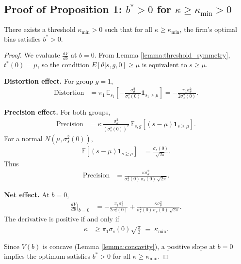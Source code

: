 \subsection{Proof of Proposition 1: $b^* > 0$ for $\kappa \geq \kappa_{\text{min}} > 0$}

\begin{proposition}
There exists a threshold $\kappa_{\min} > 0$ such that for all $\kappa \geq \kappa_{\min}$, the firm's optimal bias satisfies $b^* > 0$.
\end{proposition}

\begin{proof}
We evaluate $\frac{dV}{db}$ at $b=0$. From Lemma \ref{lemma:threshold_symmetry}, $t^*(0)=\mu$, so the condition $E[\theta|s,g,0] \ge \mu$ is equivalent to $s \ge \mu$.

\textbf{Distortion effect.} For group $g=1$,
\begin{align}
\text{Distortion} &= \pi_1 \, \mathbb{E}_{s_1}\left[-\frac{\sigma_\theta^2}{\sigma_s^2(0)} \mathbf{1}_{s_1 \ge \mu}\right] = -\frac{\pi_1 \sigma_\theta^2}{2\sigma_s^2(0)}.
\end{align}

\textbf{Precision effect.} For both groups,
\begin{align}
\text{Precision} &= \kappa \, \frac{\sigma_\theta^2}{(\sigma_s^2(0))^2} \, \mathbb{E}_{s,g}\!\left[(s-\mu)\mathbf{1}_{s \ge \mu}\right].
\end{align}
For a normal $N(\mu,\sigma_s^2(0))$, 
\begin{align}
\mathbb{E}[(s-\mu)\mathbf{1}_{s \ge \mu}] &= \frac{\sigma_s(0)}{\sqrt{2\pi}}.
\end{align}
Thus
\begin{align}
\text{Precision} &= \frac{\kappa \sigma_\theta^2}{\sigma_s^2(0)\,\sigma_s(0)\,\sqrt{2\pi}}.
\end{align}

\textbf{Net effect.} At $b=0$,
\begin{align}
\frac{dV}{db}\Big|_{b=0} &= -\frac{\pi_1 \sigma_\theta^2}{2\sigma_s^2(0)} + \frac{\kappa \sigma_\theta^2}{\sigma_s^2(0)\,\sigma_s(0)\,\sqrt{2\pi}}.
\end{align}
The derivative is positive if and only if
\begin{align}
\kappa &\geq \pi_1 \sigma_s(0) \sqrt{\tfrac{\pi}{2}} \;\equiv\; \kappa_{\min}.
\end{align}

Since $V(b)$ is concave (Lemma \ref{lemma:concavity}), a positive slope at $b=0$ implies the optimum satisfies $b^* > 0$ for all $\kappa \geq \kappa_{\min}$.
\end{proof}


